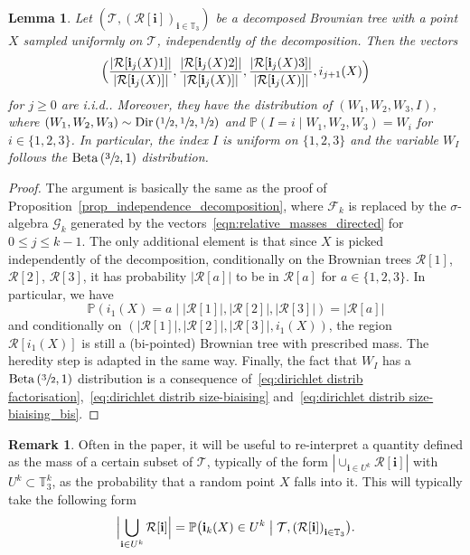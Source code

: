 \documentclass[11pt]{article}
\newcommand{\Ppsq}[2]{\mathbb{P} \left(#1\mathrel{}\middle|\mathrel{}#2\right)}
\newcommand{\bPpsq}[2]{\mathbb{P} \bigl(#1\bigm|#2\bigr)}
\newcommand{\Tt}{\mathcal{T}}
\newcommand{\Rr}{\mathcal{R}}
\newcommand{\ii}{\mathbf{i}}
\newcommand{\Dir}{\mathrm{Dir}}
\theoremstyle{plain}
\newtheorem{lemma}[theorem]{Lemma}
\theoremstyle{definition}
\newtheorem{remark}[theorem]{Remark}
\numberwithin{equation}{section}
\begin{document}
\begin{lemma}\label{lem_independence_pointed_decomposition}
Let $\left( \Tt, \left( \Rr[\ii] \right)_{\ii \in \mathbb{T}_3} \right)$ be a decomposed Brownian tree with a point $X$ sampled uniformly on $\Tt$, independently of the decomposition.
Then the vectors
\begin{equation}\label{eqn:relative_masses_directed}
\Bigl( \frac{\left| \Rr[\ii _j(X)1] \right|}{\left| \Rr[\ii _j(X)] \right|}, \frac{\left| \Rr[\ii _j(X)2] \right|}{\left| \Rr[\ii _j(X)] \right|}, \frac{\left| \Rr[\ii _j(X)3] \right|}{\left| \Rr[\ii _j(X)] \right|}, i_{j+1}(X) \Bigr)
\end{equation}
for $j \geq 0$ are i.i.d.. Moreover, they have the distribution of $(W_1, W_2, W_3, I)$, where $(W_1, W_2, W_3) \sim \Dir \left( \sfrac{1}{2}, \sfrac{1}{2}, \sfrac{1}{2} \right)$ and $\Ppsq{ I=i}{W_1, W_2, W_3}=W_i$ for $i \in \{1,2,3\}$. In particular, the index $I$ is uniform on $\{1,2,3\}$ and the variable $W_I$ follows the $\mathrm{Beta}\left( \sfrac{3}{2},1 \right)$ distribution.
\end{lemma}

\begin{proof}
The argument is basically the same as the proof of Proposition~\ref{prop_independence_decomposition}, where $\mathcal{F}_k$ is replaced by the $\sigma$-algebra $\mathcal{G}_k$ generated by the vectors~\eqref{eqn:relative_masses_directed} for $0 \leq j \leq k-1$.
The only additional element is that since $X$ is picked independently of the decomposition, conditionally on the Brownian trees $\Rr[1]$, $\Rr[2]$, $\Rr[3]$, it has probability $\left| \Rr[a] \right|$ to be in $\Rr[a]$ for $a \in \{1,2,3\}$.
In particular, we have
\[ \Ppsq{i_1(X)=a}{\left| \Rr[1] \right|, \left| \Rr[2] \right|, \left| \Rr[3] \right|} = |\Rr[a]| \]
and conditionally on $\left( \left| \Rr[1] \right|, \left| \Rr[2] \right|, \left| \Rr[3] \right|, i_1(X) \right)$, the region $\Rr[i_1(X)]$ is still a (bi-pointed) Brownian tree with prescribed mass. The heredity step is adapted in the same way.
Finally, the fact that $W_I$ has a $\mathrm{Beta}\left(\sfrac{3}{2},1\right)$ distribution is a consequence of~\eqref{eq:dirichlet distrib factorisation},~\eqref{eq:dirichlet distrib size-biaising} and~\eqref{eq:dirichlet distrib size-biaising_bis}.
\end{proof}
\begin{remark}\label{rem:mass in Tt as probability}
Often in the paper, it will be useful to re-interpret a quantity defined as the mass of a certain subset of $\Tt$, typically of the form $|\cup_{\ii \in U^k}\Rr[\ii]|$ with $U^k \subset \mathbb{T}_3^k$, as the probability that a random point $X$ falls into it. This will typically take the following form
\begin{align*}
\Bigl|\bigcup_{\ii \in U^k}\Rr[\ii]\Bigr| = \bPpsq{\ii_k(X)\in U^k}{\Tt, \left( \Rr[\ii] \right)_{\ii \in \mathbb{T}_3} }.
\end{align*}
\end{remark}
\end{document}
